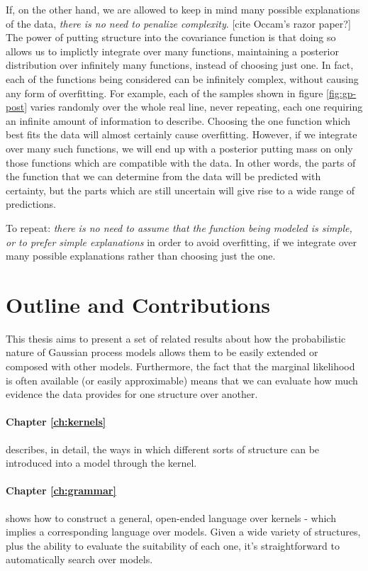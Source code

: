 If, on the other hand, we are allowed to keep in mind many possible explanations of the data, \emph{there is no need to penalize complexity}. [cite Occam's razor paper?]
The power of putting structure into the covariance function is that doing so allows us to implictly integrate over many functions, maintaining a posterior distribution over infinitely many functions, instead of choosing just one.
In fact, each of the functions being considered can be infinitely complex, without causing any form of overfitting.
For example, each of the samples shown in figure \ref{fig:gp-post} varies randomly over the whole real line, never repeating, each one requiring an infinite amount of information to describe.
Choosing the one function which best fits the data will almost certainly cause overfitting.
However, if we integrate over many such functions, we will end up with a posterior putting mass on only those functions which are compatible with the data.
In other words, the parts of the function that we can determine from the data will be predicted with certainty, but the parts which are still uncertain will give rise to a wide range of predictions.

To repeat: \emph{there is no need to assume that the function being modeled is simple, or to prefer simple explanations} in order to avoid overfitting, if we integrate over many possible explanations rather than choosing just the one.




\section{Outline and Contributions}

This thesis aims to present a set of related results about how the probabilistic nature of Gaussian process models allows them to be easily extended or composed with other models.
Furthermore, the fact that the marginal likelihood is often available (or easily approximable) means that we can evaluate how much evidence the data provides for one structure over another.


\paragraph{Chapter \ref{ch:kernels}} describes, in detail, the ways in which different sorts of structure can be introduced into a \gp{} model through the kernel.

\paragraph{Chapter \ref{ch:grammar}} shows how to construct a general, open-ended language over kernels - which implies a corresponding language over models.
Given a wide variety of structures, plus the ability to evaluate the suitability of each one, it's straightforward to automatically search over models.

